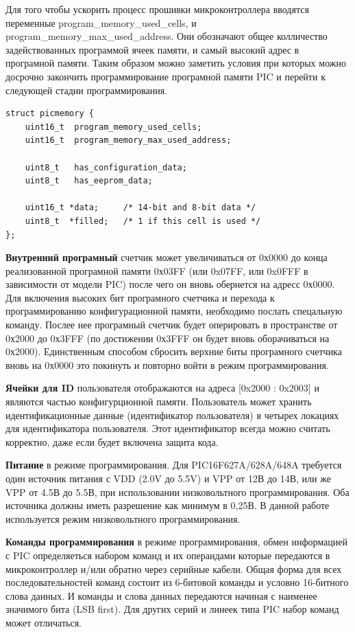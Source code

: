 Для того чтобы ускорить процесс прошивки микроконтроллера вводятся переменные program\_memory\_used\_cells, и program\_memory\_max\_used\_address. Они обозначают общее колличество задействованных программой ячеек памяти, и самый высокий адрес в програмной памяти. Таким образом можно заметить условия при которых можно досрочно закончить программирование програмной памяти PIC и перейти к следующей стадии программирования.

\begin{small}
\begin{verbatim}
struct picmemory {
    uint16_t  program_memory_used_cells;
    uint16_t  program_memory_max_used_address;

    uint8_t   has_configuration_data;
    uint8_t   has_eeprom_data;

    uint16_t *data;     /* 14-bit and 8-bit data */
    uint8_t  *filled;   /* 1 if this cell is used */
};
\end{verbatim}
\end{small}

\textbf{Внутренний програмный}
счетчик может увеличиваться от 0х0000 до 
конца реализованной програмной памяти 0х03FF (или 0x07FF, или 0x0FFF в зависимости от модели PIC)
после чего он вновь обернется на адресс 0х0000.
Для включения высоких бит програмного счетчика и перехода
к программированию конфигурационной памяти, необходимо послать спецальную команду.
Послее нее програмный счетчик будет оперировать в пространстве от 0х2000 до 0х3FFF
(по достижении 0х3FFF он будет вновь оборачиваться на 0х2000). Единственным 
способом сбросить верхние биты програмного счетчика вновь на 0х0000 это покинуть и
повторно войти в режим программирования.

\textbf{Ячейки для ID}
пользователя отображаются на адреса [0x2000 : 0x2003] и являются 
частью конфигурционной памяти. Пользователь может хранить 
идентификационные данные (идентификатор пользователя) в
четырех локациях для идентификатора пользователя. Этот идентификатор всегда можно считать
корректно, даже если будет включена защита кода.

\textbf{Питание}
в режиме программирования. Для PIC16F627A/628A/648A требуется один источник питания с VDD 
(2.0V до 5.5V) и VPP от 12В до 14В, или же VPP от 4.5В до 5.5В, 
при использовании низковольтного программирования. 
Оба источника должны иметь разрешение как минимум в 0,25В. В данной работе 
используется режим низковольтного программирования.

\textbf{Команды программирования} 
в режиме программирования, обмен информацией с PIC определяеться набором команд и 
их операндами которые передаются в микроконтроллер и/или обратно через серийные кабели. 
Общая форма для всех последовательностей команд
состоит из 6-битовой команды и условно 16-битного
слова данных. И команды и слова данных передаются начиная с наименее значимого бита (LSB first).
Для других серий и линеек типа PIC набор команд может отличаться.

